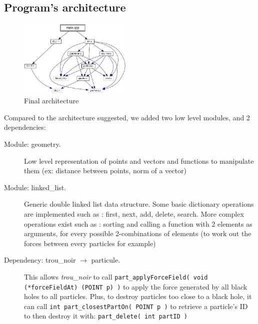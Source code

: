 \documentclass[a4paper]{article} %
\begin{document}
\begin{multicols*}{2}
\section{Program's architecture}


\begin{figure}[H]
\centering
\includegraphics[width=0.48\textwidth]{architecture.jpg}
\caption{Final architecture}
\end{figure}


Compared to the architecture suggested, we added two low level modules, and 2 dependencies:
\begin{description}
\item[Module: geometry.]
Low level representation of points and vectors and functions to manipulate them (ex: distance between points, norm of a vector)


\item[Module: linked\_list.]
Generic double linked list data structure.
Some basic dictionary operations are implemented such as : first, next, add, delete, search.
More complex operations exist such as : sorting and calling a function with 2 elements as arguments, for every possible 2-combinations of elements
(to work out the forces between every particles for example)


\item[Dependency: trou\_noir $\rightarrow$ particule.]
This allows \emph{trou\_noir} to call \texttt{part\_applyForceField( void (*forceFieldAt) (POINT p) )}
to apply the force generated by all black holes to all particles.
Plus, to destroy particles too close to a black hole, it can call \texttt{int part\_closestPartOn( POINT p )}
to retrieve a particle's ID to then destroy it with: \texttt{part\_delete( int partID )}


\end{description}
\end{multicols*}
\end{document}
